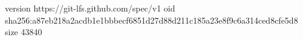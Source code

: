 version https://git-lfs.github.com/spec/v1
oid sha256:a87eb218a2acdb1e1bbbecf6851d27d88d211c185a23e8f9c6a314ced8cfe5d8
size 43840
